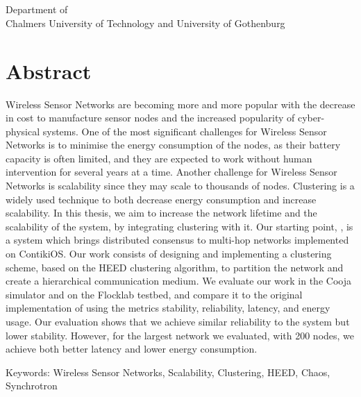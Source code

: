 \headline\\
\subtitle\\
\authors\\
Department of \department\\
Chalmers University of Technology and University of Gothenburg\setlength{\parskip}{0.5cm}

\thispagestyle{plain}            %
\setlength{\parskip}{0pt plus 1.0pt}
\section*{Abstract}

Wireless Sensor Networks are becoming more and more popular with the decrease in cost to manufacture sensor nodes and the increased popularity of cyber-physical systems. One of the most significant challenges for Wireless Sensor Networks is to minimise the energy consumption of the nodes, as their battery capacity is often limited, and they are expected to work without human intervention for several years at a time. Another challenge for Wireless Sensor Networks is scalability since they may scale to thousands of nodes. Clustering is a widely used technique to both decrease energy consumption and increase scalability. In this thesis, we aim to increase the network lifetime and the scalability of the \atwo{} system, by integrating clustering with it. Our starting point, \atwo{}, is a system which brings distributed consensus to multi-hop networks implemented on ContikiOS. Our work consists of designing and implementing a clustering scheme, based on the HEED clustering algorithm, to partition the network and create a hierarchical communication medium. We evaluate our work in the Cooja simulator and on the Flocklab testbed, and compare it to the original implementation of \atwo{} using the metrics stability, reliability, latency, and energy usage. Our evaluation shows that we achieve similar reliability to the \atwo{} system but lower stability. However, for the largest network we evaluated, with 200 nodes, we achieve both better latency and lower energy consumption.

\vfill
Keywords: Wireless Sensor Networks, Scalability, Clustering, HEED, Chaos, \atwo{} Synchrotron

\newpage                %
\thispagestyle{empty}
\mbox{}